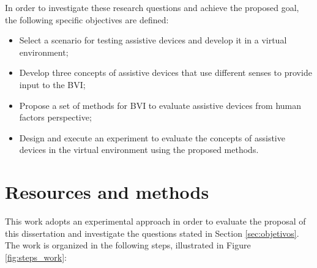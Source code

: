  
 In order to investigate these research questions and achieve the proposed goal, the following specific objectives are defined:
 
 \begin{itemize}
     \item Select a scenario for testing assistive devices and develop it in a virtual environment; \label{itm:subobj_first}
     \item Develop three concepts of assistive devices that use different senses to provide input to the BVI; \label{itm:subobj_second}
     \item Propose a set of methods for BVI to evaluate assistive devices from human factors perspective; \label{itm:subobj_third}
     \item Design and execute an experiment to evaluate the concepts of assistive devices in the virtual environment using the proposed methods. \label{itm:subobj_forth}
 \end{itemize}
 
 
 

\section{Resources and methods} 


This work adopts an experimental approach in order to evaluate the proposal of this dissertation and investigate the questions stated in Section \ref{sec:objetivos}. 
The work is organized in the following steps, illustrated in Figure \ref{fig:steps_work}:

